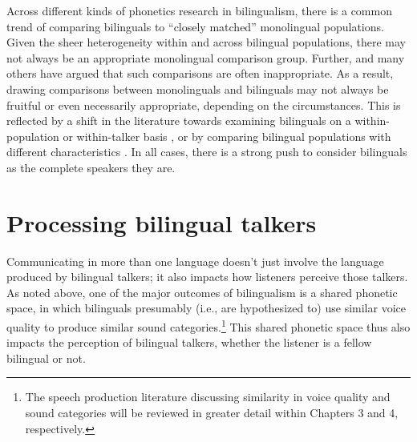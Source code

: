 Across different kinds of phonetics research in bilingualism, there is a common trend of comparing bilinguals to ``closely matched'' monolingual populations. Given the sheer heterogeneity within and across bilingual populations, there may not always be an appropriate monolingual comparison group. Further, \citet{grosjean_1989_bilingual} and many others have argued that such comparisons are often inappropriate. As a result, drawing comparisons between monolinguals and bilinguals may not always be fruitful or even necessarily appropriate, depending on the circumstances. This is reflected by a shift in the literature towards examining bilinguals on a within-population \citep[e.g.,][]{chan_2020_lexically} or within-talker basis \citep[e.g.,][]{simonet_2019_convergence}, or by comparing bilingual populations with different characteristics \citep[e.g.,][]{brown_2009_phonological}. In all cases, there is a strong push to consider bilinguals as the complete speakers they are.


\section{Processing bilingual talkers}\label{ch1:sec:processing}

Communicating in more than one language doesn't just involve the language produced by bilingual talkers; it also impacts how listeners perceive those talkers. As noted above, one of the major outcomes of bilingualism is a shared phonetic space, in which bilinguals presumably (i.e., are hypothesized to) use similar voice quality to produce similar sound categories.\footnote{The speech production literature discussing similarity in voice quality and sound categories will be reviewed in greater detail within Chapters 3 and 4, respectively.} This shared phonetic space thus also impacts the perception of bilingual talkers, whether the listener is a fellow bilingual or not.

